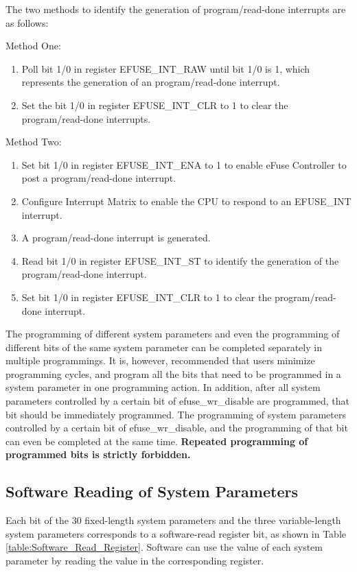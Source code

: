 \documentclass[main\_\_EN.tex]{subfiles}
\begin{document}
The two methods to identify the generation of program/read-done interrupts are as follows:

Method One:
\begin{enumerate}
    \item Poll bit 1/0 in register EFUSE\_INT\_RAW until bit 1/0 is 1, which represents the generation of an program/read-done interrupt.
    \item Set the bit 1/0 in register EFUSE\_INT\_CLR to 1 to clear the program/read-done interrupts.
\end{enumerate}

Method Two:
\begin{enumerate}
    \item Set bit 1/0 in register EFUSE\_INT\_ENA to 1 to enable eFuse Controller to post a program/read-done interrupt.
    \item Configure Interrupt Matrix to enable the CPU to respond to an EFUSE\_INT interrupt.
    \item A program/read-done interrupt is generated.
    \item Read bit 1/0 in register EFUSE\_INT\_ST to identify the generation of the program/read-done interrupt.
    \item Set bit 1/0 in register EFUSE\_INT\_CLR to 1 to clear the program/read-done interrupt.
\end{enumerate}

The programming of different system parameters and even the programming of different bits of the same system parameter can be completed separately in multiple programmings. It is, however, recommended that users minimize programming cycles, and program all the bits that need to be programmed in a system parameter in one programming action. In addition, after all system parameters controlled by a certain bit of efuse\_wr\_disable are programmed, that bit should be immediately programmed. The programming of system parameters controlled by a certain bit of efuse\_wr\_disable, and the programming of that bit can even be completed at the same time. \textbf{Repeated programming of programmed bits is strictly forbidden.}

\subsection{Software Reading of System Parameters}

Each bit of the 30 fixed-length system parameters and the three variable-length system parameters corresponds to a software-read register bit, as shown in Table \ref{table:Software_Read_Register}.
Software can use the value of each system parameter by reading the value in the corresponding register.
\end{document}
